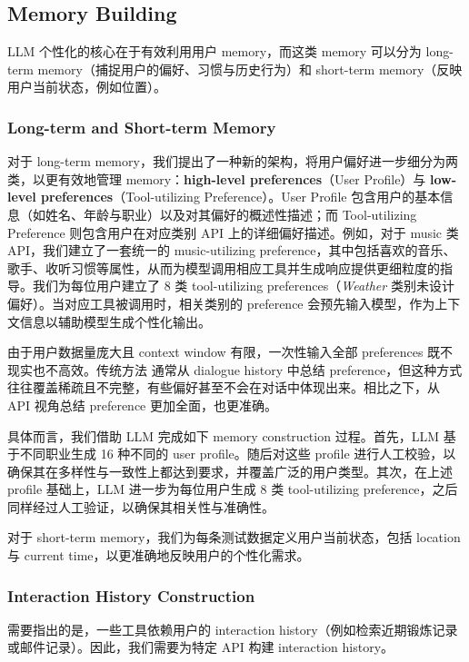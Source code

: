 \documentclass[11pt]{article}
\begin{document}
\subsection{Memory Building}
LLM 个性化的核心在于有效利用用户 memory，而这类 memory 可以分为 long-term memory（捕捉用户的偏好、习惯与历史行为）和 short-term memory（反映用户当前状态，例如位置）。

\subsubsection{Long-term and Short-term Memory}
对于 long-term memory，我们提出了一种新的架构，将用户偏好进一步细分为两类，以更有效地管理 memory：\textbf{high-level preferences}（User Profile）与 \textbf{low-level preferences}（Tool-utilizing Preference）。User Profile 包含用户的基本信息（如姓名、年龄与职业）以及对其偏好的概述性描述；而 Tool-utilizing Preference 则包含用户在对应类别 API 上的详细偏好描述。例如，对于 music 类 API，我们建立了一套统一的 music-utilizing preference，其中包括喜欢的音乐、歌手、收听习惯等属性，从而为模型调用相应工具并生成响应提供更细粒度的指导。我们为每位用户建立了 8 类 tool-utilizing preferences（\textit{Weather} 类别未设计偏好）。当对应工具被调用时，相关类别的 preference 会预先输入模型，作为上下文信息以辅助模型生成个性化输出。

由于用户数据量庞大且 context window 有限，一次性输入全部 preferences 既不现实也不高效。传统方法 \cite{zhao2025do} 通常从 dialogue history 中总结 preference，但这种方式往往覆盖稀疏且不完整，有些偏好甚至不会在对话中体现出来。相比之下，从 API 视角总结 preference 更加全面，也更准确。



具体而言，我们借助 LLM 完成如下 memory construction 过程。首先，LLM 基于不同职业生成 16 种不同的 user profile。随后对这些 profile 进行人工校验，以确保其在多样性与一致性上都达到要求，并覆盖广泛的用户类型。其次，在上述 profile 基础上，LLM 进一步为每位用户生成 8 类 tool-utilizing preference，之后同样经过人工验证，以确保其相关性与准确性。


对于 short-term memory，我们为每条测试数据定义用户当前状态，包括 location 与 current time，以更准确地反映用户的个性化需求。


\subsubsection{Interaction History Construction}
需要指出的是，一些工具依赖用户的 interaction history（例如检索近期锻炼记录或邮件记录）。因此，我们需要为特定 API 构建 interaction history。
\end{document}
